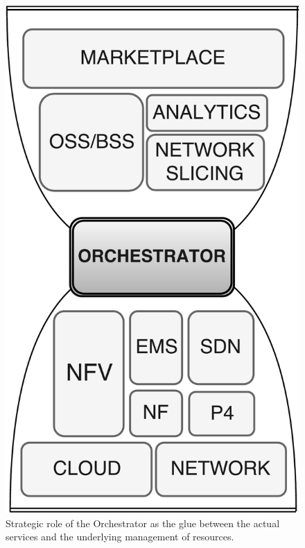 \begin{figure}[t!]
  \centering
  \includegraphics[scale=.2]{Figures/03_NSO/orchestrator}
    \caption{Strategic role of the Orchestrator as the glue between the actual services and the underlying management of resources.}
    \label{orch}
\end{figure}

